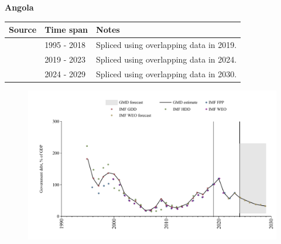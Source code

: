 \documentclass[12pt,a4paper,landscape]{article}
\begin{document}
\begin{adjustbox}{max totalsize={\paperwidth}{\paperheight},center}
\begin{minipage}[t][\textheight][t]{\textwidth}
\vspace*{0.5cm}
{}
\begin{center}
{\Large\bfseries Angola}
\end{center}
\vspace{0.5cm}
\begin{table}[H]
\centering
\small
\begin{tabular}{|l|l|l|}
\hline
\textbf{Source} & \textbf{Time span} & \textbf{Notes} \\
\hline
\rowcolor{white}\cite{IMF_GDD}& 1995 - 2018 &Spliced using overlapping data in 2019.\\
\rowcolor{lightgray}\cite{IMF_FPP}& 2019 - 2023 &Spliced using overlapping data in 2024.\\
\rowcolor{white}\cite{IMF_WEO_forecast}& 2024 - 2029 &Spliced using overlapping data in 2030.\\
\hline
\end{tabular}
\end{table}
\begin{figure}[H]
\centering
\includegraphics[width=\textwidth,height=0.6\textheight,keepaspectratio]{graphs/AGO_govdebt_GDP.pdf}
\end{figure}
\end{minipage}
\end{adjustbox}
\end{document}
